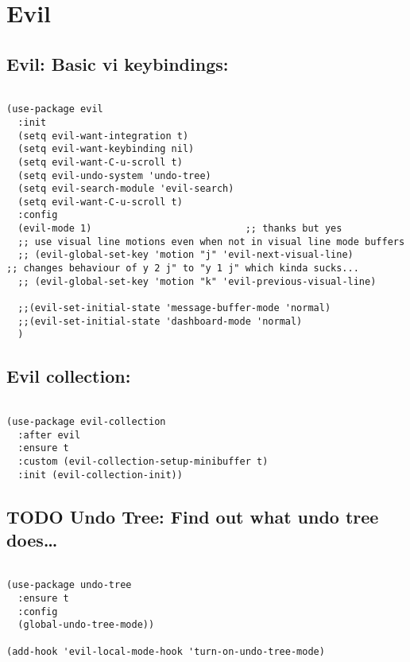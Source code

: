 \documentclass[11pt]{article}
\begin{document}
\section{Evil}
\label{sec:org79ed3e0}
\subsection{Evil: Basic vi keybindings:}
\label{sec:org3ebf9e4}

\begin{verbatim}

(use-package evil
  :init
  (setq evil-want-integration t)
  (setq evil-want-keybinding nil)
  (setq evil-want-C-u-scroll t)
  (setq evil-undo-system 'undo-tree)
  (setq evil-search-module 'evil-search)
  (setq evil-want-C-u-scroll t)
  :config
  (evil-mode 1)                           ;; thanks but yes
  ;; use visual line motions even when not in visual line mode buffers
  ;; (evil-global-set-key 'motion "j" 'evil-next-visual-line)           ;; changes behaviour of y 2 j" to "y 1 j" which kinda sucks...
  ;; (evil-global-set-key 'motion "k" 'evil-previous-visual-line)

  ;;(evil-set-initial-state 'message-buffer-mode 'normal)
  ;;(evil-set-initial-state 'dashboard-mode 'normal)
  )

\end{verbatim}

\subsection{Evil collection:}
\label{sec:orga6e9aac}

\begin{verbatim}

(use-package evil-collection
  :after evil
  :ensure t
  :custom (evil-collection-setup-minibuffer t)
  :init (evil-collection-init))

\end{verbatim}

\subsection{{\bfseries\sffamily TODO} Undo Tree: Find out what undo tree does\ldots{}}
\label{sec:org285de31}

\begin{verbatim}

(use-package undo-tree
  :ensure t
  :config
  (global-undo-tree-mode))

(add-hook 'evil-local-mode-hook 'turn-on-undo-tree-mode)

\end{verbatim}
\end{document}
